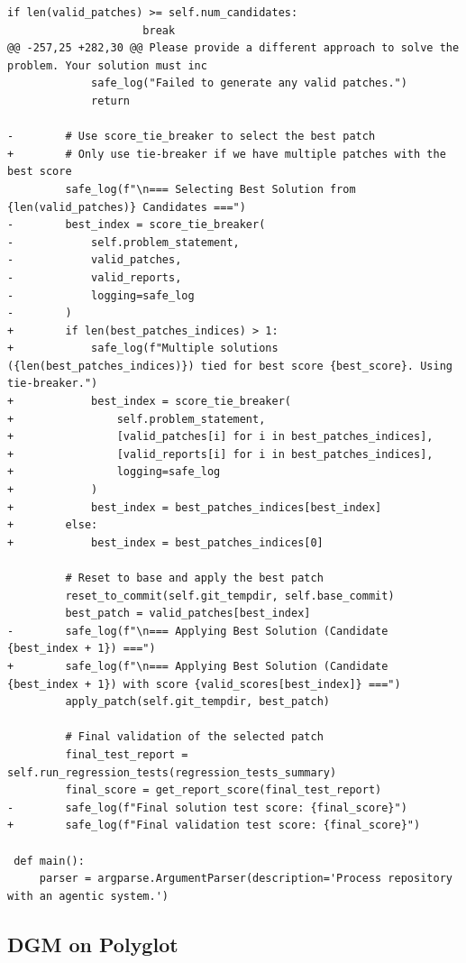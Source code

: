 \documentclass{article}
\begin{document}
\begin{lstlisting}[style=diffstyle]
                 if len(valid_patches) >= self.num_candidates:
                     break
@@ -257,25 +282,30 @@ Please provide a different approach to solve the problem. Your solution must inc
             safe_log("Failed to generate any valid patches.")
             return
 
-        # Use score_tie_breaker to select the best patch
+        # Only use tie-breaker if we have multiple patches with the best score
         safe_log(f"\n=== Selecting Best Solution from {len(valid_patches)} Candidates ===")
-        best_index = score_tie_breaker(
-            self.problem_statement,
-            valid_patches,
-            valid_reports,
-            logging=safe_log
-        )
+        if len(best_patches_indices) > 1:
+            safe_log(f"Multiple solutions ({len(best_patches_indices)}) tied for best score {best_score}. Using tie-breaker.")
+            best_index = score_tie_breaker(
+                self.problem_statement,
+                [valid_patches[i] for i in best_patches_indices],
+                [valid_reports[i] for i in best_patches_indices],
+                logging=safe_log
+            )
+            best_index = best_patches_indices[best_index]
+        else:
+            best_index = best_patches_indices[0]
 
         # Reset to base and apply the best patch
         reset_to_commit(self.git_tempdir, self.base_commit)
         best_patch = valid_patches[best_index]
-        safe_log(f"\n=== Applying Best Solution (Candidate {best_index + 1}) ===")
+        safe_log(f"\n=== Applying Best Solution (Candidate {best_index + 1}) with score {valid_scores[best_index]} ===")
         apply_patch(self.git_tempdir, best_patch)
 
         # Final validation of the selected patch
         final_test_report = self.run_regression_tests(regression_tests_summary)
         final_score = get_report_score(final_test_report)
-        safe_log(f"Final solution test score: {final_score}")
+        safe_log(f"Final validation test score: {final_score}")
 
 def main():
     parser = argparse.ArgumentParser(description='Process repository with an agentic system.')
\end{lstlisting}


\subsection{DGM on Polyglot}
\label{app:best-agent-dgm-polyglot}
\end{document}
